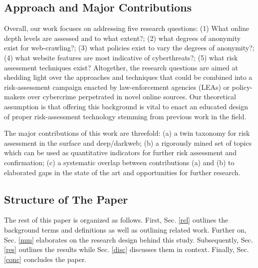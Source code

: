 \subsection{Approach and Major Contributions}
Overall, our work focuses on addressing five research questions: (1) What online depth levels are assessed and to what extent?; (2) what degrees of anonymity exist for web-crawling?; (3) what policies exist to vary the degrees of anonymity?; (4) what website features are most indicative of cyberthreats?; (5) what risk assessment techniques exist?  Altogether, the research questions are aimed at shedding light over the approaches and techniques that could be combined into a risk-assessment campaign enacted by law-enforcement agencies (LEAs) or policy-makers over cybercrime perpetrated in novel online sources. Our theoretical assumption is that offering this background is vital to enact an educated design of proper risk-assessment technology stemming from previous work in the field.

The major contributions of this work are threefold: (a) a twin taxonomy for risk assessment in the surface and deep/darkweb; (b) a rigorously mined set of topics which can be used as quantitative indicators for  further risk assessment and confirmation; (c) a systematic overlap between contributions (a) and (b) to elaborated gaps in the state of the art and opportunities for further research.

\subsection{Structure of The Paper}

The rest of this paper is organized as follows. First, Sec. \ref{rel} outlines the background terms and definitions as well as outlining related work. Further on, Sec. \ref{mm} elaborates on the research design behind this study. Subsequently, Sec. \ref{res} outlines the results while Sec. \ref{disc} discusses them in context. Finally, Sec. \ref{conc} concludes the paper.


